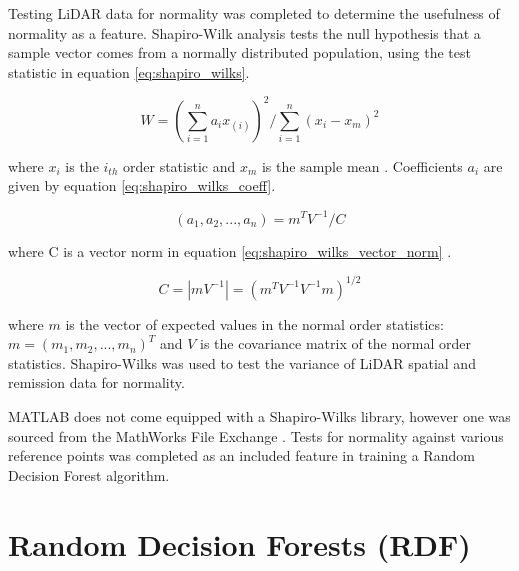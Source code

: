 \documentclass[numbered,pdftex]{ohio-etd}
\begin{document}
{{		{Testing LiDAR data for normality was completed to determine the usefulness of normality as a feature. Shapiro-Wilk analysis \cite{shapiro_analysis_1965, royston_extension_1982} tests the null hypothesis that a sample vector comes from a normally distributed population, using the test statistic in equation \ref{eq:shapiro_wilks}.}
		
		\begin{equation}
			W = (\sum_{i=1}^{n} a_i x_{(i)})^2 / \sum_{i=1}^{n}(x_i - x_m)^2
			\label{eq:shapiro_wilks}
		\end{equation}
	
		{where $x_i$ is the $i_{th}$ order statistic and $x_m$ is the sample mean \cite{shapiro_analysis_1965}. Coefficients $a_{i}$ are given by equation \ref{eq:shapiro_wilks_coeff}.}
		
		\begin{equation}
			(a_1, a_2, ...,a_n) = m^{T} V^{-1} / C
			\label{eq:shapiro_wilks_coeff}
		\end{equation}
		
		{where C is a vector norm in equation \ref{eq:shapiro_wilks_vector_norm} \cite{davis_covariance_1977}.}
		
		\begin{equation}
			C = |mV^{-1}| = (m^{T} V^{-1} V^{-1} m)^{1/2}
			\label{eq:shapiro_wilks_vector_norm}
		\end{equation}
		
		{where $m$ is the vector of expected values in the normal order statistics: $m = (m_1, m_2,...,m_n)^{T}$ and $V$ is the covariance matrix of the normal order statistics. Shapiro-Wilks was used to test the variance of LiDAR spatial and remission data for normality.}
		
		{MATLAB does not come equipped with a Shapiro-Wilks library, however one was sourced from the MathWorks File Exchange \cite{noauthor_shapiro-wilk_nodate}. Tests for normality against various reference points was completed as an included feature in training a Random Decision Forest algorithm.}	
		
	} %
	
	\section{Random Decision Forests (RDF)}\label{RDF_SECT}{
		
}}
\end{document}
